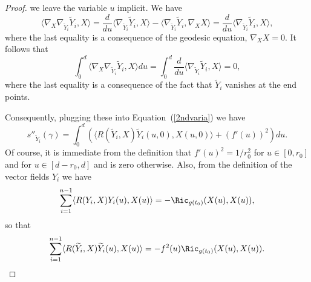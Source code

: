 \begin{proof}
we leave the variable $u$ implicit. We have
$$\langle
\nabla_X\nabla_{\widetilde Y_i}\widetilde
Y_i,X\rangle=\frac{d}{du}\langle \nabla_{\widetilde Y_i}\widetilde
Y_i,X\rangle-\langle \nabla_{\widetilde Y_i}\widetilde
Y_i,\nabla_XX\rangle=\frac{d}{du}\langle \nabla_{\widetilde
Y_i}\widetilde Y_i,X\rangle,$$ where the last equality is a
consequence of the geodesic equation, $\nabla_XX=0$. It follows that
$$\int_0^d\langle
\nabla_X\nabla_{\widetilde Y_i}\widetilde Y_i,X\rangle
du=\int_0^d\frac{d}{du}\langle \nabla_{\widetilde Y_i}\widetilde
Y_i,X\rangle=0,$$ where the last equality is a consequence of the
fact that $\widetilde Y_i$ vanishes at the end points.

Consequently, plugging these into Equation~(\ref{2ndvaria}) we have
\begin{equation} \label{sformula} s''_{\widetilde Y_i}(\gamma) =
  \int_0^d\left(\langle R(\widetilde Y_i,X)\widetilde
Y_i(u,0),X(u,0)\rangle+(f'(u))^2\right)du. \end{equation} Of course,
it is immediate from the definition that $f'(u)^2=1/r_0^2$ for $u\in
[0,r_0]$ and for $u\in [d-r_0,d]$ and is zero otherwise. Also, from
the definition of the vector fields $Y_i$ we have
$$\sum_{i=1}^{n-1}\langle
R(Y_i,X)Y_i(u),X(u)\rangle=-\Ric_{g(t_0)}(X(u),X(u)),$$ so that
$$\sum_{i=1}^{n-1}\langle
R(\widetilde Y_i,X)\widetilde
Y_i(u),X(u)\rangle=-f^2(u)\Ric_{g(t_0)}(X(u),X(u)).$$


\end{proof}
